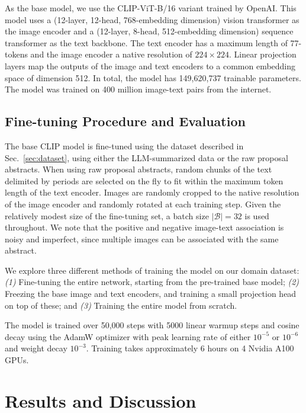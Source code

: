 \documentclass[10pt]{article} %
\begin{document}
As the base model, we use the CLIP-ViT-B/16 \citep{radford2021learning} variant trained by OpenAI. This model uses a (12-layer, 12-head, 768-embedding dimension) vision transformer as the image encoder and a (12-layer, 8-head, 512-embedding dimension) sequence transformer as the text backbone. The text encoder has a maximum length of 77-tokens and the image encoder a native resolution of $224\times224$. Linear projection layers map the outputs of the image and text encoders to a common embedding space of dimension 512. In total, the model has 149,620,737 trainable parameters. The model was trained on 400 million image-text pairs from the internet. 

\subsection{Fine-tuning Procedure and Evaluation}
\label{sec:finetuning}

The base CLIP model is fine-tuned using the dataset described in Sec.~\ref{sec:dataset}, using either the LLM-summarized data or the raw proposal abstracts. When using raw proposal abstracts, random chunks of the text delimited by periods are selected on the fly to fit within the maximum token length of the text encoder. Images are randomly cropped to the native resolution of the image encoder and randomly rotated at each training step. Given the relatively modest size of the fine-tuning set, a batch size $|\mathcal B| = 32$ is used throughout. We note that the positive and negative image-text association is noisy and imperfect, since multiple images can be associated with the same abstract.

We explore three different methods of training the model on our domain dataset: \emph{(1)} Fine-tuning the entire network, starting from the pre-trained base model; \emph{(2)} Freezing the base image and text encoders, and training a small projection head on top of these; and \emph{(3)} Training the entire model from scratch.

The model is trained over 50,000 steps with 5000 linear warmup steps and cosine decay using the AdamW optimizer \citep{DBLP:conf/iclr/LoshchilovH19,DBLP:journals/corr/KingmaB14} with peak learning rate of either $10^{-5}$ or $10^{-6}$ and weight decay $10^{-3}$. Training takes approximately 6 hours on 4 Nvidia A100 GPUs.

\section{Results and Discussion}
\label{sec:results}
\end{document}
